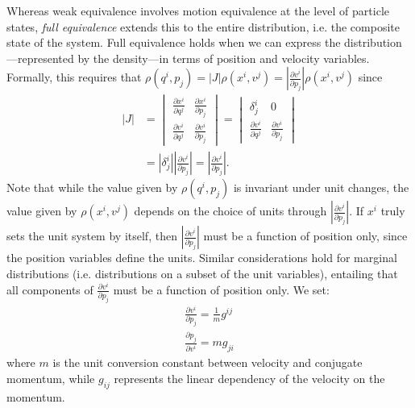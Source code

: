 \documentclass[12pt, twoside]{article}
\begin{document}
Whereas weak equivalence involves motion equivalence at the level of particle states, \textit{full equivalence} extends this to the entire distribution, i.e. the composite state of the system. Full equivalence holds when we can express the distribution---represented by the density---in terms of position and velocity variables. Formally, this requires that $\rho(q^i, p_j) = |J| \rho(x^i, v^j) = \left|\frac{\partial v^i}{\partial p_j}\right| \rho(x^i, v^j)$ since
\begin{equation}
\begin{aligned}
|J| &= \begin{vmatrix}
\frac{\partial x^i}{\partial q^j} & \frac{\partial x^i}{\partial p_j} \\
\frac{\partial v^i}{\partial q^j} & \frac{\partial v^i}{\partial p_j}
\end{vmatrix}
= \begin{vmatrix}
\delta^i_j & 0 \\
\frac{\partial v^i}{\partial q^j} & \frac{\partial v^i}{\partial p_j}
\end{vmatrix} \\
&= \left|\delta^i_j\right| \left|\frac{\partial v^i}{\partial p_j}\right| 
= \left|\frac{\partial v^i}{\partial p_j}\right|.
\end{aligned}
\end{equation}
Note that while the value given by $\rho(q^i, p_j)$ is invariant under unit changes, the value given by $\rho(x^i, v^j)$ depends on the choice of units through $\left|\frac{\partial v^i}{\partial p_j}\right|$. If $x^i$ truly sets the unit system by itself, then $\left|\frac{\partial v^i}{\partial p_j}\right|$ must be a function of position only, since the position variables define the units. Similar considerations hold for marginal distributions (i.e. distributions on a subset of the unit variables), entailing that all components of $\frac{\partial v^i}{\partial p_j}$ must be a function of position only. We set:
\begin{equation}
\begin{aligned}
\frac{\partial v^i}{\partial p_j} = \frac{1}{m} g^{ij} \\
\frac{\partial p_j}{\partial v^i} = m g_{ji}
\end{aligned}
\end{equation}
where $m$ is the unit conversion constant between velocity and conjugate momentum, while $g_{ij}$ represents the linear dependency of the velocity on the momentum. 
\end{document}

